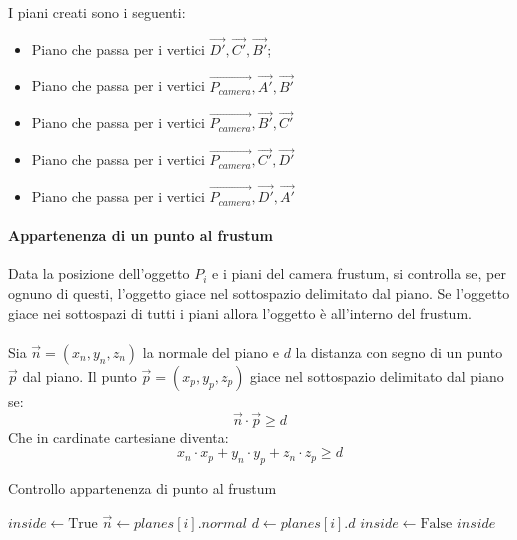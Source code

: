 I piani creati sono i seguenti:
\begin{itemize}
  \item Piano che passa per i vertici $\vec{D'}, \vec{C'}, \vec{B'}$;
  \item Piano che passa per i vertici $\overrightarrow{P_{camera}}, \vec{A'}, \vec{B'}$
  \item Piano che passa per i vertici $\overrightarrow{P_{camera}}, \vec{B'}, \vec{C'}$
  \item Piano che passa per i vertici $\overrightarrow{P_{camera}}, \vec{C'}, \vec{D'}$
  \item Piano che passa per i vertici $\overrightarrow{P_{camera}}, \vec{D'}, \vec{A'}$
\end{itemize}

\paragraph{Appartenenza di un punto al frustum}
Data la posizione dell'oggetto $P_i$ e i piani del camera frustum, si controlla se, per ognuno di questi, l'oggetto giace nel sottospazio delimitato dal piano. Se l'oggetto giace nei sottospazi di tutti i piani allora l'oggetto è all'interno del frustum.\\\\
Sia $\vec{n}=(x_n,y_n,z_n)$ la normale del piano e $d$ la distanza con segno di un punto $\vec{p}$ dal piano. Il punto $\vec{p}=(x_p,y_p,z_p)$ giace nel sottospazio delimitato dal piano se:
\begin{equation}
  \vec{n} \cdot \vec{p} \geq d
\end{equation}
Che in cardinate cartesiane diventa:
\begin{equation}
  x_n \cdot x_p + y_n \cdot y_p + z_n \cdot z_p \geq d
\end{equation}

\begin{algorithm}
  \caption{Controllo appartenenza di punto al frustum}
  \begin{algorithmic}[1]
    \State $inside \gets \text{True}$
    \State $\vec{n} \gets planes[i].normal$
    \State $d \gets planes[i].d$
    \State $inside \gets \text{False}$
    \EndIf
    \EndFor
    \State \Return $inside$
    \EndProcedure
  \end{algorithmic}
\end{algorithm}

